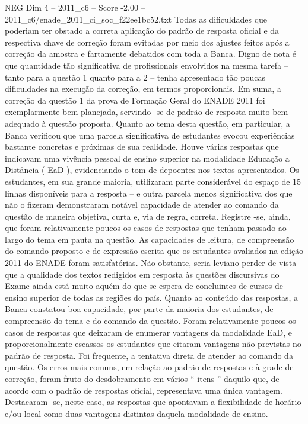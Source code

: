 \begin{textsample}{NEG Dim 4 – 2011\_c6 – Score -2.00 – 2011\_c6/enade\_2011\_ci\_soc\_f22ee1bc52.txt}
Todas as dificuldades que poderiam ter obstado a correta aplicação do padrão de resposta oficial e da respectiva chave de correção foram evitadas por meio dos ajustes feitos após a correção da amostra e fartamente debatidos com toda a Banca.
Digno de nota é que quantidade tão significativa de profissionais envolvidos na mesma tarefa – tanto para a questão 1 quanto para a 2 – tenha apresentado tão poucas dificuldades na execução da correção, em termos proporcionais.
Em suma, a correção da questão 1 da prova de Formação Geral do ENADE 2011 foi exemplarmente bem planejada, servindo -se de padrão de resposta muito bem adequado à questão proposta.
Quanto ao tema desta questão, em particular, a Banca verificou que uma parcela significativa de estudantes evocou experiências bastante concretas e próximas de sua realidade.
Houve várias respostas que indicavam uma vivência pessoal de ensino superior na modalidade Educação a Distância ( EaD ), evidenciando o tom de depoentes nos textos apresentados.
Os estudantes, em sua grande maioria, utilizaram parte considerável do espaço de 15 linhas disponíveis para a resposta – e outra parcela menos significativa dos que não o fizeram demonstraram notável capacidade de atender ao comando da questão de maneira objetiva, curta e, via de regra, correta.
Registre -se, ainda, que foram relativamente poucos os casos de respostas que tenham passado ao largo do tema em pauta na questão.
As capacidades de leitura, de compreensão do comando proposto e de expressão escrita que os estudantes avaliados na edição 2011 do ENADE foram satisfatórias.
Não obstante, seria leviano perder de vista que a qualidade dos textos redigidos em resposta às questões discursivas do Exame ainda está muito aquém do que se espera de concluintes de cursos de ensino superior de todas as regiões do país.
Quanto ao conteúdo das respostas, a Banca constatou boa capacidade, por parte da maioria dos estudantes, de compreensão do tema e do comando da questão.
Foram relativamente poucos os casos de respostas que deixaram de enumerar vantagens da modalidade EaD, e proporcionalmente escassos os estudantes que citaram vantagens não previstas no padrão de resposta.
Foi frequente, a tentativa direta de atender ao comando da questão.
Os erros mais comuns, em relação ao padrão de respostas e à grade de correção, foram fruto do desdobramento em vários “ itens ” daquilo que, de acordo com o padrão de respostas oficial, representava uma única vantagem.
Destacaram -se, neste caso, as respostas que apontavam a flexibilidade de horário e/ou local como duas vantagens distintas daquela modalidade de ensino.

\end{textsample}
